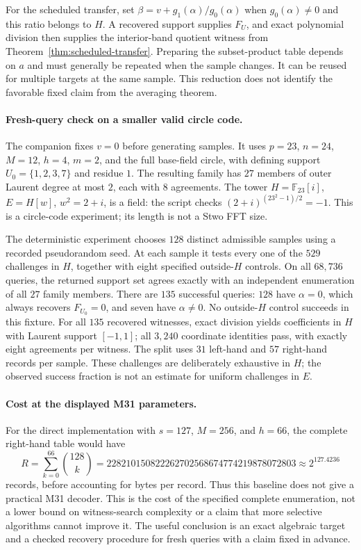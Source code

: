 \documentclass[11pt,letterpaper]{article}
\theoremstyle{definition}
\theoremstyle{remark}
\newcommand{\F}{\mathbb F}
\begin{document}
For the scheduled transfer, set $\beta=v+g_1(\alpha)/g_0(\alpha)$
when $g_0(\alpha)\ne0$ and this ratio belongs to $H$.
A recovered support supplies $F_U$, and exact polynomial division
then supplies the interior-band quotient witness from
Theorem~\ref{thm:scheduled-transfer}. Preparing the subset-product
table depends on $a$ and must generally be repeated when the sample
changes. It can be reused for multiple targets at the same sample.
This reduction does not identify the favorable fixed claim from the
averaging theorem.

\paragraph{Fresh-query check on a smaller valid circle code.}
The companion  fixes
$v=0$ before generating samples. It uses $p=23$, $n=24$, $M=12$,
$h=4$, $m=2$, and the full base-field circle, with defining support
$U_0=\{1,2,3,7\}$ and residue $1$. The resulting family has $27$
members of outer Laurent degree at most $2$, each with $8$ agreements.
The tower $H=\F_{23}[i]$, $E=H[w]$, $w^2=2+i$, is a field:
the script checks $(2+i)^{(23^2-1)/2}=-1$.
This is a circle-code experiment; its length is not a Stwo FFT size.

The deterministic experiment chooses $128$ distinct admissible
samples using a recorded pseudorandom seed. At each sample it tests
every one of the $529$ challenges in $H$, together with eight specified
outside-$H$ controls. On all $68{,}736$ queries, the returned support
set agrees exactly with an independent enumeration of all $27$
family members. There are $135$ successful queries: $128$ have
$\alpha=0$, which always recovers $F_{U_0}=0$, and seven have
$\alpha\ne0$. No outside-$H$ control succeeds in this fixture.
For all $135$ recovered witnesses, exact division yields coefficients
in $H$ with Laurent support $[-1,1]$; all $3{,}240$ coordinate
identities pass, with exactly eight agreements per witness.
The split uses $31$ left-hand and $57$ right-hand records per sample.
These challenges are deliberately exhaustive in $H$; the observed
success fraction is not an estimate for uniform challenges in $E$.

\paragraph{Cost at the displayed M31 parameters.}
For the direct implementation with $s=127$, $M=256$, and $h=66$,
the complete right-hand table would have
\[
 R=\sum_{k=0}^{66}\binom{128}{k}
 =228210150822262702568674774219878072803
 \approx 2^{127.4236}
\]
records, before accounting for bytes per record. Thus this baseline
does not give a practical M31 decoder. This is the cost of the
specified complete enumeration, not a lower bound on witness-search
complexity or a claim that more selective algorithms cannot improve it.
The useful conclusion is an exact algebraic target and a checked
recovery procedure for fresh queries with a claim fixed in advance.
\end{document}
